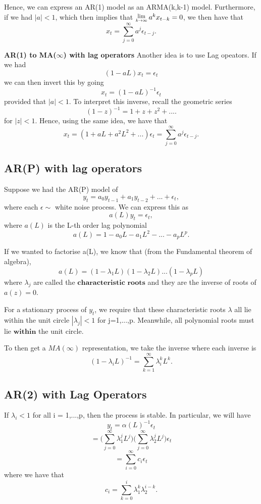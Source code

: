 \documentclass[twoside]{article}
\newcommand{\Lim}[1]{\raisebox{0.5ex}{\scalebox{0.8}{$\displaystyle \lim_{#1}\;$}}}
\begin{document}
Hence, we can express an AR(1) model as an ARMA(k,k-1) model. Furthermore, if we had $|a| < 1$, which then implies that $\Lim{k \rightarrow \infty}a^kx_{t-k} = 0$, we then have that 
$$
x_t = \sum_{j=0}^{\infty}a^j\epsilon_{t-j}.
$$

\bigskip
\textbf{AR(1) to MA($\infty$) with lag operators}
Another idea is to use Lag opeators. If we had
$$
(1 - aL)x_t = \epsilon_t
$$
we can then invert this by going
$$
x_t = (1 - aL)^{-1}\epsilon_t
$$
provided that $|a|<1$. To interpret this inverse, recall the geometric series
$$
(1 - z)^{-1} = 1 + z + z^2 + .... 
$$
for $|z|<1$. Hence, using the same idea, we have that
$$
x_t = (1 + aL + a^2L^2 + ...)\epsilon_t = \sum_{j=0}^{\infty}a^j\epsilon_{t-j}.
$$

\subsection{AR(P) with lag operators}
Suppose we had the AR(P) model of
$$
y_t = a_0y_{t-1} + a_1y_{t-2} + ... + \epsilon_t,
$$
where each $\epsilon \sim$ white noise process. We can express this as
$$
a(L)y_t = \epsilon_t,
$$
where $a(L)$ is the L-th order lag polynomial
$$
a(L) = 1 - a_0L - a_1L^2 - ... - a_pL^p.
$$

If we wanted to factorise a(L), we know that (from the Fundamental theorem of algebra),
$$
a(L) = (1 - \lambda_1L)(1 - \lambda_2L)...(1 - \lambda_pL)
$$
where $\lambda_j$ are called the $\textbf{characteristic roots}$ and they are the inverse of roots of $a(z) = 0$.

For a stationary process of $y_t$, we require that these characteristic roots $\lambda$ all lie within the unit circle $|\lambda_j|<1$ for j=1,...,p. Meanwhile, all polynomial roots must lie $\textbf{within}$ the unit circle.

To then get a $MA(\infty)$ representation, we take the inverse where each inverse is
$$
(1 - \lambda_iL)^{-1} = \sum_{k=1}^{\infty}\lambda_i^kL^k.
$$

\subsection{AR(2) with Lag Operators}
If $\lambda_i < 1$ for all i = 1,...,p, then the process is stable. In particular, we will have
$$
y_t = \alpha(L)^{-1}\epsilon_t
$$
$$
= \big(\sum_{j=0}^{\infty}\lambda_1^jL^j\big)\big(\sum_{j=0}^{\infty}\lambda_2^jL^j\big)\epsilon_t
$$
$$
= \sum_{i=0}^{\infty}c_i\epsilon_t 
$$
where we have that
$$
c_i = \sum_{k=0}^{i}\lambda_1^k\lambda_2^{i-k}.
$$
\end{document}
